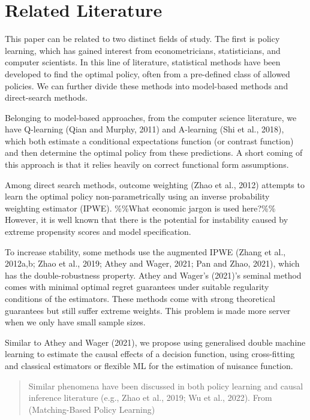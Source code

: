 \documentclass[
]{article}
\begin{document}
\section{Related Literature}\label{related-literature}

This paper can be related to two distinct fields of study. The first is
policy learning, which has gained interest from econometricians,
statisticians, and computer scientists. In this line of literature,
statistical methods have been developed to find the optimal policy,
often from a pre-defined class of allowed policies. We can further
divide these methods into model-based methods and direct-search methods.

Belonging to model-based approaches, from the computer science
literature, we have Q-learning (Qian and Murphy, 2011) and A-learning
(Shi et al., 2018), which both estimate a conditional expectations
function (or contrast function) and then determine the optimal policy
from these predictions. A short coming of this approach is that it
relies heavily on correct functional form assumptions.

Among direct search methods, outcome weighting (Zhao et al., 2012)
attempts to learn the optimal policy non-parametrically using an inverse
probability weighting estimator (IPWE). \%\%What economic jargon is used
here?\%\% However, it is well known that there is the potential for
instability caused by extreme propensity scores and model specification.

To increase stability, some methods use the augmented IPWE (Zhang et
al., 2012a,b; Zhao et al., 2019; Athey and Wager, 2021; Pan and Zhao,
2021), which has the double-robustness property. Athey and Wager's
(2021)'s seminal method comes with minimal optimal regret guarantees
under suitable regularity conditions of the estimators. These methods
come with strong theoretical guarantees but still suffer extreme
weights. This problem is made more server when we only have small sample
sizes.

Similar to Athey and Wager (2021), we propose using generalised double
machine learning to estimate the causal effects of a decision function,
using cross-fitting and classical estimators or flexible ML for the
estimation of nuisance function.

\begin{quote}
Similar phenomena have been discussed in both policy learning and causal
inference literature (e.g., Zhao et al., 2019; Wu et al., 2022). From
(Matching-Based Policy Learning)
\end{quote}
\end{document}
